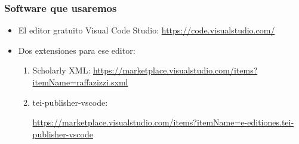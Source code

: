 \documentclass[%
  handout, %
  ]{beamer}
\begin{document}
\begin{frame}
  \frametitle{Software que usaremos}
  \begin{itemize}
    \item El editor gratuito Visual Code Studio: \url{https://code.visualstudio.com/}
    \item Dos extensiones para ese editor:
      \begin{enumerate}
        \item Scholarly XML: \url{https://marketplace.visualstudio.com/items?itemName=raffazizzi.sxml}
        \item tei-publisher-vscode:

          \url{https://marketplace.visualstudio.com/items?itemName=e-editiones.tei-publisher-vscode}
      \end{enumerate}
  \end{itemize}
\end{frame}
\end{document}
